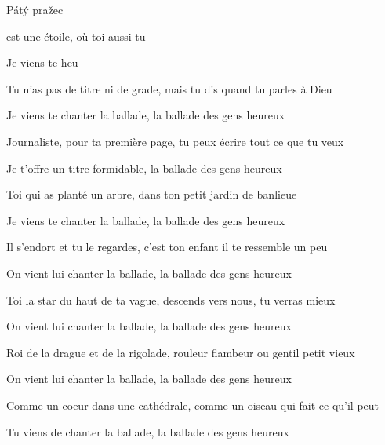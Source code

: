 

Pátý pražec

\zs
{} est une étoile, où toi aussi tu  

Je viens te      heu 
\ks

\zs
Tu n'as pas de titre ni de grade, mais tu dis  quand tu parles à Dieu

Je viens te chanter la ballade, la ballade des gens heureux
\ks

\zs
Journaliste, pour ta première page, tu peux écrire tout ce que tu veux

Je t'offre un titre formidable, la ballade des gens heureux 
\ks

\zs
Toi qui as planté un arbre, dans ton petit jardin de banlieue

Je viens te chanter la ballade, la ballade des gens heureux
\ks

\zs
Il s'endort et tu le regardes, c'est ton enfant il te ressemble un peu

On vient lui chanter la ballade, la ballade des gens heureux 
\ks

\zs
Toi la star du haut de ta vague, descends vers nous, tu verras mieux

On vient lui chanter la ballade, la ballade des gens heureux 
\ks

\zs
Roi de la drague et de la rigolade, rouleur flambeur ou gentil petit vieux

On vient lui chanter la ballade, la ballade des gens heureux 
\ks

\zs
Comme un coeur dans une cathédrale, comme un oiseau qui fait ce qu'il peut

Tu viens de chanter la ballade, la ballade des gens heureux
\ks

\kp

